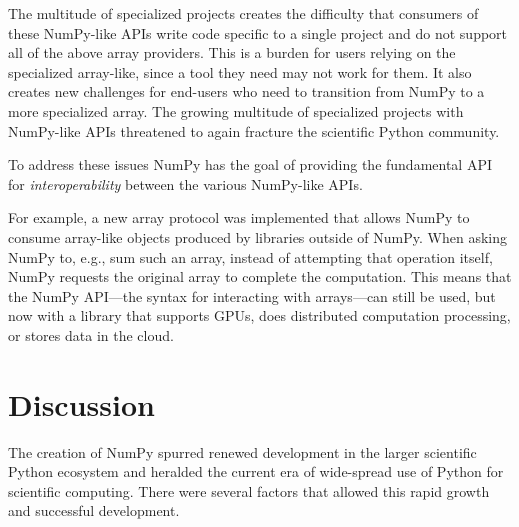 
The multitude of specialized projects creates the difficulty that consumers
of these NumPy-like APIs write code specific to a single project and do not support
all of the above array providers.
This is a burden for users relying on the specialized array-like, since
a tool they need may not work for them.
It also creates new challenges for end-users who need to transition
from NumPy to a more specialized array.
The growing multitude of specialized projects with NumPy-like APIs threatened
to again fracture the scientific Python community.


To address these issues NumPy has the goal of providing the fundamental
API for \emph{interoperability} between the various NumPy-like APIs.

For example, a new array protocol was implemented that allows NumPy to consume
array-like objects produced by libraries outside of NumPy.  When asking NumPy
to, e.g., sum such an array, instead of attempting that operation itself, NumPy
requests the original array to complete the computation.  This means that the
NumPy API---the syntax for interacting with arrays---can still be used, but now
with a library that supports GPUs, does distributed computation processing, or
stores data in the cloud.


\section*{Discussion}



The creation of NumPy spurred renewed development in the larger scientific
Python ecosystem and heralded the current era of wide-spread use of Python for
scientific computing.
There were several factors that allowed this rapid growth
and successful development.

